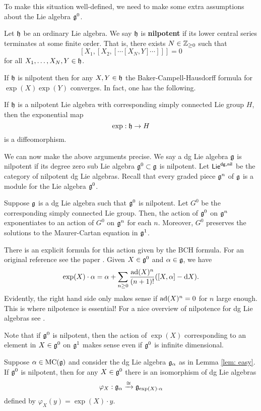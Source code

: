 \documentclass[11pt]{amsart}
\begin{document}
To make this situation well-defined, we need to make some extra assumptions about the Lie algebra $\mathfrak g^0$. 

\begin{dfn}
Let $\mathfrak h$ be an ordinary Lie algebra.
We say $\mathfrak h$ is {\bf nilpotent} if its lower central series terminates at some finite order. 
That is, there exists $N \in \mathbb Z_{\geq 0}$ such that 
\[
[X_1,[X_2,[\cdots[X_N,Y]\cdots]]] = 0
\]
for all $X_1,\ldots,X_N, Y \in \mathfrak h$.
\end{dfn}

If $\mathfrak h$ is nilpotent then for any $X, Y \in \mathfrak h$ the Baker-Campell-Hausdorff formula for $\exp(X)\exp(Y)$ converges. 
In fact, one has the following.

\begin{prop}
If $\mathfrak h$ is a nilpotent Lie algebra with corresponding simply connected Lie group $H$, then the exponential map
\[
\exp : \mathfrak h \to H
\] 
is a diffeomorphism.
\end{prop}

We can now make the above arguments precise. 
We say a dg Lie algebra $\mathfrak g$ is nilpotent if its degree zero sub Lie algebra $\mathfrak g^0 \subset \mathfrak g$ is nilpotent. 
Let ${\sf Lie}^{\sf dg,nil}$ be the category of nilpotent dg Lie algebras.
Recall that every graded piece $\mathfrak g^n$ of $\mathfrak g$ is a module for the Lie algebra $\mathfrak g^0$. 

\begin{lem}
Suppose $\mathfrak g$ is a dg Lie algebra such that $\mathfrak g^0$ is nilpotent.
Let $G^0$ be the corresponding simply connected Lie group. 
Then, the action of $\mathfrak g^0$ on $\mathfrak g^n$ exponentiates to an action of $G^0$ on $\mathfrak g^n$ for each $n$. 
Moreover, $G^0$ preserves the solutions to the Maurer-Cartan equation in $\mathfrak g^1$.
\end{lem}

There is an explicit formula for this action given by the BCH formula. 
For an original reference see the paper \cite{GM}. 
Given $X \in \mathfrak g^0$ and $\alpha \in \mathfrak g$, we have
\[
\exp(X) \cdot \alpha = \alpha + \sum_{n \geq 0} \frac{{\rm ad}(X)^n}{(n+1)!} ([X, \alpha] - {\rm d} X) .
\] 
Evidently, the right hand side only makes sense if ${\rm ad}(X)^n = 0$ for $n$ large enough.
This is where nilpotence is essential!
For a nice overview of nilpotence for dg Lie algebras see \cite{Getzler}. 

\begin{rmk}
Note that if $\mathfrak g^0$ is nilpotent, then the action of $\exp(X)$ corresponding to an element in $X \in \mathfrak g^0$ on $\mathfrak g^1$ makes sense even if $\mathfrak g^0$ is infinite dimensional. 
\end{rmk}

\begin{lem}
Suppose $\alpha \in {\rm MC}(\mathfrak g)$ and consider the dg Lie algebra $\mathfrak g_\alpha$ as in Lemma \ref{lem: easy}. 
If $\mathfrak g^0$ is nilpotent, then for any $X \in \mathfrak g^0$ there is an isomorphism of dg Lie algebras
\[
\varphi_X : \mathfrak g_{\alpha} \xrightarrow{\cong} \mathfrak g_{\exp(X) \cdot \alpha}
\]
defined by $\varphi_X(y) = \exp(X) \cdot y$. 
\end{lem}


%  

\end{document}
